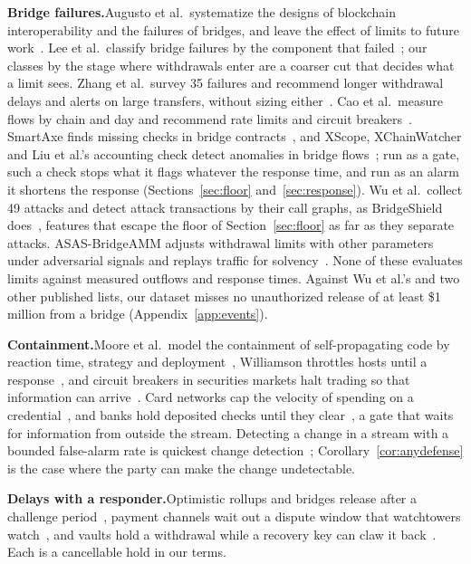 \documentclass[conference,compsoc]{IEEEtran}
\numberwithin{equation}{section}
\theoremstyle{plain}
\theoremstyle{definition}
\theoremstyle{remark}
\newcommand{\runin}[1]{\par\smallskip\noindent\textbf{#1.}\enspace}
\begin{document}
\runin{Bridge failures}Augusto et al.\ systematize the designs of blockchain interoperability and the failures of bridges, and leave the effect of limits to future work~\cite{augusto2024sok}. Lee et al.\ classify bridge failures by the component that failed~\cite{lee2023bridgehacks}; our classes by the stage where withdrawals enter are a coarser cut that decides what a limit sees. Zhang et al.\ survey 35 failures and recommend longer withdrawal delays and alerts on large transfers, without sizing either~\cite{zhang2024bridges}. Cao et al.\ measure flows by chain and day and recommend rate limits and circuit breakers~\cite{cao2026price}. SmartAxe finds missing checks in bridge contracts~\cite{liao2024smartaxe}, and XScope, XChainWatcher and Liu et al.'s accounting check detect anomalies in bridge flows~\cite{zhang2022xscope,augusto2025xchainwatcher,liu2024monte}; run as a gate, such a check stops what it flags whatever the response time, and run as an alarm it shortens the response (Sections~\ref{sec:floor} and~\ref{sec:response}). Wu et al.\ collect 49 attacks and detect attack transactions by their call graphs, as BridgeShield does~\cite{wu2025bridgeguard,lin2025bridgeshield}, features that escape the floor of Section~\ref{sec:floor} as far as they separate attacks. ASAS-BridgeAMM adjusts withdrawal limits with other parameters under adversarial signals and replays traffic for solvency~\cite{you2026asas}. None of these evaluates limits against measured outflows and response times. Against Wu et al.'s and two other published lists, our dataset misses no unauthorized release of at least \$1 million from a bridge (Appendix~\ref{app:events}).

\runin{Containment}Moore et al.\ model the containment of self-propagating code by reaction time, strategy and deployment~\cite{moore2003quarantine}, Williamson throttles hosts until a response~\cite{williamson2002throttling}, and circuit breakers in securities markets halt trading so that information can arrive~\cite{greenwald1991transactional}. Card networks cap the velocity of spending on a credential~\cite{bolton2002fraud}, and banks hold deposited checks until they clear~\cite{regcc}, a gate that waits for information from outside the stream. Detecting a change in a stream with a bounded false-alarm rate is quickest change detection~\cite{page1954continuous,tartakovsky2014sequential}; Corollary~\ref{cor:anydefense} is the case where the party can make the change undetectable.

\runin{Delays with a responder}Optimistic rollups and bridges release after a challenge period~\cite{kalodner2018arbitrum}, payment channels wait out a dispute window that watchtowers watch~\cite{mccorry2019pisa,avarikioti2020cerberus}, and vaults hold a withdrawal while a recovery key can claw it back~\cite{moser2016covenants}. Each is a cancellable hold in our terms.
\end{document}
